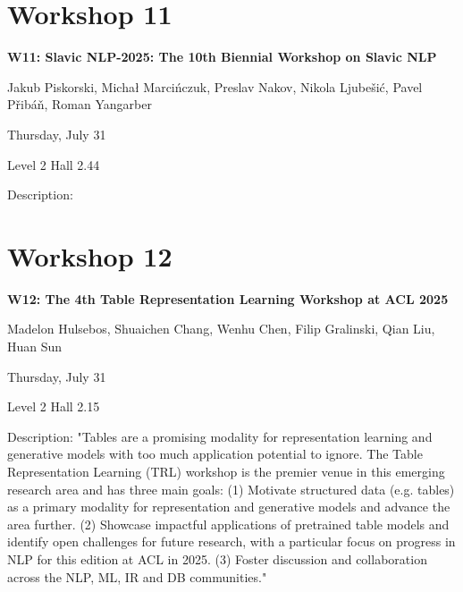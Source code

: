 \clearpage



\section[W11: Slavic NLP-2025: The 10th Biennial Workshop on Slavic NLP]{Workshop 11}

\begin{center}
    {\Large \textbf{W11: Slavic NLP-2025: The 10th Biennial Workshop on Slavic NLP}}

   Jakub Piskorski, Michał Marcińczuk, Preslav Nakov, Nikola Ljubešić, Pavel Přibáň, Roman Yangarber

    Thursday, July 31
    
   Level 2 Hall 2.44

\end{center}

Description:

\clearpage



\section[W12: The 4th Table Representation Learning Workshop at ACL 2025]{Workshop 12}

\begin{center}
    {\Large \textbf{W12: The 4th Table Representation Learning Workshop at ACL 2025}}

   Madelon Hulsebos, Shuaichen Chang, Wenhu Chen, Filip Gralinski, Qian Liu, Huan Sun

    Thursday, July 31
    
   Level 2 Hall 2.15

\end{center}

Description: "Tables are a promising modality for representation learning and generative models with too much application potential to ignore. The Table Representation Learning (TRL) workshop is the premier venue in this emerging research area and has three main goals:
(1) Motivate structured data (e.g. tables) as a primary modality for representation and generative models and advance the area further.
(2) Showcase impactful applications of pretrained table models and identify open challenges for future research, with a particular focus on progress in NLP for this edition at ACL in 2025.
(3) Foster discussion and collaboration across the NLP, ML, IR and DB communities."


